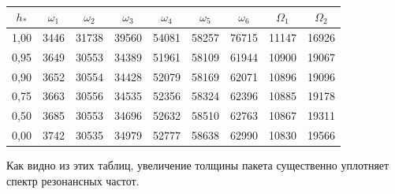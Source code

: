 
\begin{table}[h!] \centering \small

\caption{\label{ned:tab:5}}

\setlength{\extrarowheight}{4pt}

\setlength{\tabcolsep}{9pt}

\vspace{-3mm}

\begin{tabular}{c|c|c|c|c|c|c|c|c}

\hline

\footnotesize $h_{*}$ &\footnotesize  $\omega_1$ &\footnotesize  $\omega_2$ &\footnotesize  $\omega_3$ &\footnotesize  $\omega_4$ &\footnotesize  $\omega_5$ &\footnotesize  $\omega_6$ &\footnotesize  $\Omega_1$ &\footnotesize  $\Omega_2$\\

\hline

\rule{0mm}{14pt}%

1,00 & 3446 & 31738 & 39560 & 54081 & 58257 & 76715 & 11147 & 16926\\


0,95 & 3649 & 30553 & 34389 & 51961 & 58109 & 61944 & 10900 & 19067\\


0,90 & 3652 & 30554 & 34428 & 52079 & 58169 & 62071 & 10896 & 19096\\


0,75 & 3663 & 30556 & 34535 & 52356 & 58324 & 62396 & 10885 & 19178\\


0,50 & 3685 & 30553 & 34696 & 52632 & 58510 & 62763 & 10867 & 19311\\


0,00 & 3742 & 30535 & 34979 & 52777 & 58638 & 62990 & 10830 & 19566\\

\hline

\end{tabular}

\vspace{-3mm}

\end{table}



Как видно из этих таблиц, увеличение толщины пакета существенно уплотняет спектр резонансных частот.

